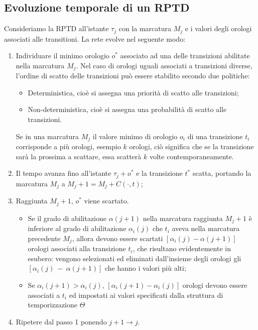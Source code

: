 \documentclass[a4paper]{report}
\begin{document}
\subsection{Evoluzione temporale di un RPTD}
Consideriamo la RPTD all'istante $\tau_j$ con la marcatura $M_j$ e i
valori degli orologi associati alle transitioni. La rete evolve nel
seguente modo:
\begin{enumerate}
\item Individuare il minimo orologio $o^*$ associato ad una delle
  transizioni abilitate nella marcatura $M_j$. Nel caso di orologi
  uguali associati a transizioni diverse, l'ordine di scatto delle
  transizioni pu\`o essere stabilito secondo due politiche:
  \begin{itemize}
  \item Deterministica, cio\`e si assegna una priorit\`a di scatto
    alle transizioni; 
  \item Non-deterministica, cio\`e si assegna una probabilit\`a di
    scatto alle transizioni.
  \end{itemize}
  
  Se in una marcatura
  $M_j$ il valore minimo di orologio $o_i$ di una transizione $t_i$
  corrisponde a pi\`u orologi, esempio $k$ orologi, ci\`o significa
  che se la transizione sar\`a la prossima a scattare, essa scatter\`a
  $k$ volte contemporaneamente. 
\item Il tempo avanza fino all'istante $\tau_j + o^*$ e la transizione
  $t^*$ scatta, portando la marcatura $M_j$ a $M_j + 1 = M_j +
  C(\cdot, t)$;
\item Raggiunta $M_j + 1$, $o^*$ viene scartato.
  \begin{itemize}
  \item Se il grado di abilitazione $\alpha(j + 1)$ nella marcatura
    raggiunta $M_j + 1$ \`e inferiore al grado di abilitazione
    $\alpha_i(j)$ che $t_i$ aveva nella marcatura precedente $M_j$, allora
    devono essere scartati $[\alpha_i(j) - \alpha(j + 1)]$ orologi
    associati alla transizione  $t_i$, che risultano evidentemente in
    esubero: vengono selezionati ed eliminati dall'insieme degli
    orologi gli $[\alpha_i(j)~-~\alpha(j + 1)]$ che hanno i valori
    pi\`u alti; 
  \item Se $\alpha_i(j + 1) > \alpha_i(j)$, $[\alpha_i(j + 1) -
    \alpha_i(j)]$ orologi devono essere associati a $t_i$ ed impostati
    ai valori specificati dalla struttura di temporizzazione $\Theta$
  \end{itemize}
\item Ripetere dal passo 1 ponendo $j + 1 \rightarrow j$.
\end{enumerate}
\end{document}
